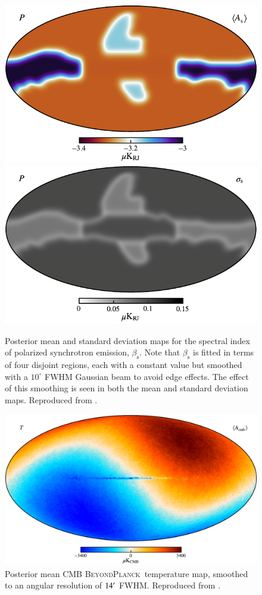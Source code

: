 \documentclass[onecolumn]{aa}
\newcommand{\BP}{\textsc{BeyondPlanck}}
\begin{document}
\begin{figure}[t]
  \center
  \includegraphics[width=0.49\linewidth]{figs/BP_synch_v2_QU_BETA_MEAN_w12_n1024_cb_c-fusion.pdf}
  \includegraphics[width=0.49\linewidth]{figs/BP_synch_v2_QU_BETA_STDDEV_w12_n1024_cb_c-neutral_r.pdf}
  \caption{Posterior mean and standard deviation maps for the spectral
    index of polarized synchrotron emission,
    $\beta_{\mathrm{s}}$. Note that $\beta_{\mathrm{s}}$ is fitted in
    terms of four disjoint regions, each with a constant value but
    smoothed with a $10^{\circ}$ FWHM Gaussian beam to avoid edge
    effects. The effect of this smoothing is seen in both the mean and
    standard deviation maps. Reproduced from \citet{bp14}.}\label{fig:synch_beta_pol}

  \center
  \includegraphics[width=0.9\linewidth]{figs/BP_cmb_v2_I_MEAN_w18_n1024_cb_c-planck.pdf}
  \caption{Posterior mean CMB \BP\ temperature map, smoothed to an
    angular resolution of $14\arcm$ FWHM. Reproduced from \citet{bp11}.}\label{fig:cmb_with_dipole}
\end{figure}
\end{document}
